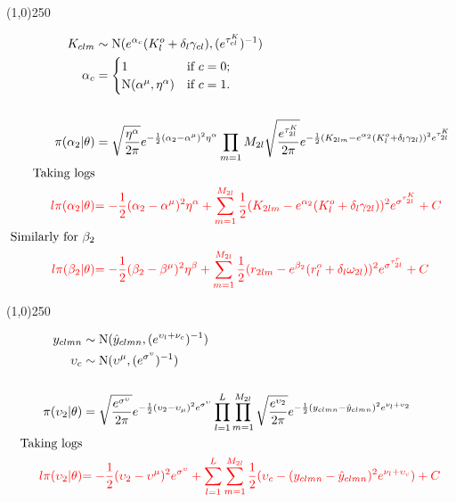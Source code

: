 \begin{center}
\line(1,0){250}
\end{center}

\begin{align*}
K_{clm} &\sim \operatorname{N}(e^{\alpha_{c}}(K_{l}^o+\delta_{l}\gamma_{cl}),(e^{ \tau_{cl}^K })^{-1})\\
\alpha_{c}&=\begin{cases}
1  & \text{if } c=0;\\
\operatorname{N}(\alpha^{\mu},\eta^{\alpha})  & \text{if } c=1.
\end{cases}\\
\\
\pi(\alpha_{2}|\theta)&=
\sqrt{\frac{\eta^{\alpha}}{2\pi}} e^{-\frac{1}{2}(\alpha_{2}-\alpha^{\mu})^{2}\eta^{\alpha} }
\prod_{m=1}{M_{2l}}
\sqrt{\frac{e^{ \tau_{2l}^K }}{2\pi}} e^{-\frac{1}{2}(K_{2lm}-e^{\alpha_{2}}(K_{l}^o+\delta_{l}\gamma_{2l}))^{2}e^{ \tau_{2l}^K } }\\
\text{Taking logs}\\
\color{red}{l\pi(\alpha_{2}|\theta)}&
\color{red}{
=-\frac{1}{2}(\alpha_{2}-\alpha^{\mu})^{2}\eta^{\alpha}  
+
\sum_{m=1}^{M_{2l}}\frac{1}{2}(K_{2lm}-e^{\alpha_{2}}(K_{l}^o+\delta_{l}\gamma_{2l}))^{2}e^{\sigma^{\tau_{2l}^K}}
+C
}\\
\text{Similarly for $\beta_{2}$}\\
\color{red}{l\pi(\beta_{2}|\theta)}&
\color{red}{
=-\frac{1}{2}(\beta_{2}-\beta^{\mu})^{2}\eta^{\beta}  
+
\sum_{m=1}^{M_{2l}}\frac{1}{2}(r_{2lm}-e^{\beta_{2}}(r_{l}^o+\delta_{l}\omega_{2l}))^{2}e^{\sigma^{\tau_{2l}^r}}
+C
}
\end{align*}


\begin{center}
\line(1,0){250}
\end{center}


\begin{align*}
y_{clmn} &\sim \operatorname{N}(\hat{y}_{clmn},(e^{ \upsilon_{l}+\nu_{c}  })^{-1} ) \\
\upsilon_{c} &\sim \operatorname{N}(\upsilon^{\mu},(e^{ \sigma^{\upsilon} })^{-1})\\
\\
\pi(\upsilon_{2}|\theta)&=\sqrt{\frac{e^{ \sigma^{\upsilon} }}{2\pi}} e^{-\frac{1}{2}(\upsilon_{2}-\upsilon_{\mu})^{2}e^{ \sigma^{\upsilon} } }
\prod_{l=1}^{L}\prod_{m=1}^{M_{2l}}\sqrt{\frac{e^{ \upsilon_{2} }}{2\pi}} e^{-\frac{1}{2}(y_{clmn}-\hat{y}_{clmn})^{2}e^{ \nu_{l} +\upsilon_{2} } }\\
\text{Taking logs}\\
\color{red}{l\pi(\upsilon_{2}|\theta)}&
\color{red}{
=-\frac{1}{2}(\upsilon_{2}-\upsilon^{\mu})^{2}e^{ \sigma^{\upsilon} } 
+
\sum_{l=1}^{L}\sum_{m=1}^{M_{2l}}\frac{1}{2}(\upsilon_{c}-(y_{clmn}-\hat{y}_{clmn})^{2}e^{\nu_{l}+\upsilon_{c} })
+C}
\end{align*}

